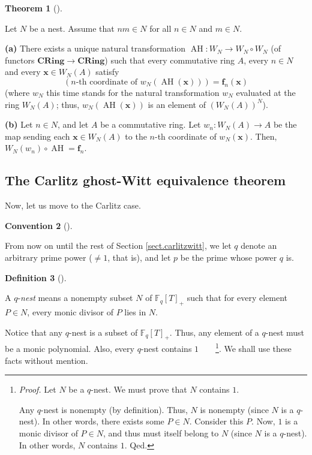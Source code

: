 \documentclass[numbers=enddot,12pt,final,onecolumn,notitlepage]{scrartcl}%
\theoremstyle{definition}
\newtheorem{theo}{Theorem}[section]
\newenvironment{theorem}[1][]
{\begin{theo}[#1]\begin{leftbar}}
{\end{leftbar}\end{theo}}
\newtheorem{defi}[theo]{Definition}
\newenvironment{definition}[1][]
{\begin{defi}[#1]\begin{leftbar}}
{\end{leftbar}\end{defi}}
\newtheorem{conv}[theo]{Convention}
\newenvironment{condition}[1][]
{\begin{conv}[#1]\begin{leftbar}}
{\end{leftbar}\end{conv}}
\begin{document}
\begin{theorem}
\label{thm.Witt.AH}Let $N$ be a nest. Assume that $nm\in N$ for all $n\in N$
and $m\in N$.

\textbf{(a)} There exists a unique natural transformation $\operatorname*{AH}%
:W_{N}\rightarrow W_{N}\circ W_{N}$ (of functors $\mathbf{CRing}%
\rightarrow\mathbf{CRing}$) such that every commutative ring $A$, every $n\in
N$ and every $\mathbf{x}\in W_{N}\left(  A\right)  $ satisfy%
\[
\left(  n\text{-th coordinate of }w_{N}\left(  \operatorname*{AH}\left(
\mathbf{x}\right)  \right)  \right)  =\mathbf{f}_{n}\left(  \mathbf{x}\right)
\]
(where $w_{N}$ this time stands for the natural transformation $w_{N}$
evaluated at the ring $W_{N}\left(  A\right)  $; thus, $w_{N}\left(
\operatorname*{AH}\left(  \mathbf{x}\right)  \right)  $ is an element of
$\left(  W_{N}\left(  A\right)  \right)  ^{N}$).

\textbf{(b)} Let $n\in N$, and let $A$ be a commutative ring. Let $w_{n}%
:W_{N}\left(  A\right)  \rightarrow A$ be the map sending each $\mathbf{x}\in
W_{N}\left(  A\right)  $ to the $n$-th coordinate of $w_{N}\left(
\mathbf{x}\right)  $. Then, $W_{N}\left(  w_{n}\right)  \circ
\operatorname*{AH}=\mathbf{f}_{n}$.
\end{theorem}

\subsection{The Carlitz ghost-Witt equivalence theorem}

Now, let us move to the Carlitz case.

\begin{condition}
From now on until the rest of Section \ref{sect.carlitzwitt}, we let $q$
denote an arbitrary prime power ($\neq1$, that is), and let $p$ be the prime
whose power $q$ is.
\end{condition}

\begin{definition}
\label{def.q-nest}A $q$-\textit{nest} means a nonempty subset $N$ of
$\mathbb{F}_{q}\left[  T\right]  _{+}$ such that for every element $P\in N$,
every monic divisor of $P$ lies in $N$.
\end{definition}

Notice that any $q$-nest is a subset of $\mathbb{F}_{q}\left[  T\right]  _{+}%
$. Thus, any element of a $q$-nest must be a monic polynomial. Also, every
$q$-nest contains $1$\ \ \ \ \footnote{\textit{Proof.} Let $N$ be a $q$-nest.
We must prove that $N$ contains $1$.
\par
Any $q$-nest is nonempty (by definition). Thus, $N$ is nonempty (since $N$ is
a $q$-nest). In other words, there exists some $P\in N$. Consider this $P$.
Now, $1$ is a monic divisor of $P\in N$, and thus must itself belong to $N$
(since $N$ is a $q$-nest). In other words, $N$ contains $1$. Qed.}. We shall
use these facts without mention.
\end{document}
